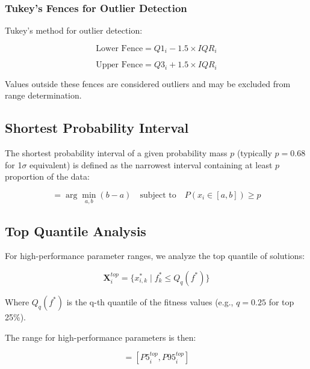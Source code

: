 \documentclass[../main.tex]{subfiles}
\begin{document}
\subsubsection{Tukey's Fences for Outlier Detection}

Tukey's method for outlier detection:

\begin{equation}
\text{Lower Fence} = Q1_i - 1.5 \times IQR_i
\label{eq:lower_fence}
\end{equation}

\begin{equation}
\text{Upper Fence} = Q3_i + 1.5 \times IQR_i
\label{eq:upper_fence}
\end{equation}

Values outside these fences are considered outliers and may be excluded from range determination.

\subsection{Shortest Probability Interval}

The shortest probability interval of a given probability mass $p$ (typically $p = 0.68$ for 1$\sigma$ equivalent) is defined as the narrowest interval containing at least $p$ proportion of the data:

\begin{equation}
[x_i^L, x_i^U] = \arg\min_{a,b} (b - a) \quad \text{subject to} \quad P(x_i \in [a,b]) \geq p
\label{eq:shortest_interval}
\end{equation}

\subsection{Top Quantile Analysis}

For high-performance parameter ranges, we analyze the top quantile of solutions:

\begin{equation}
\mathbf{X}_i^{top} = \{x_{i,k}^* \mid f_k^* \leq Q_q(f^*)\}
\label{eq:top_quantile}
\end{equation}

Where $Q_q(f^*)$ is the q-th quantile of the fitness values (e.g., $q = 0.25$ for top 25\%).

The range for high-performance parameters is then:

\begin{equation}
[x_i^{min}, x_i^{max}] = [P5_i^{top}, P95_i^{top}]
\label{eq:top_quantile_range}
\end{equation}
\end{document}
